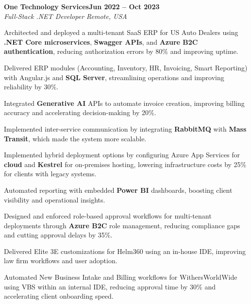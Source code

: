 \documentclass[letterpaper,10pt]{article}
\newcommand{\headingBf}[2]{
  \hspace{10pt}\textbf{#1}\hfill\textbf{#2}\\
}
\newcommand{\headingIt}[2]{
  \hspace{10pt}\textit{#1}\hfill\textit{#2}\\
}
\newenvironment{resume_list}{
  \vspace{-7pt}
  \begin{itemize}[itemsep=-2px, parsep=1pt, leftmargin=30pt]
}{
  \end{itemize}
}
\begin{document}
\headingBf{One Technology Services}{Jun 2022 -- Oct 2023}
\headingIt{Full-Stack .NET Developer \hfill Remote, USA}{}
\begin{resume_list}
    \item Architected and deployed a multi-tenant SaaS ERP for US Auto Dealers using \textbf{.NET Core microservices}, \textbf{Swagger APIs}, and \textbf{Azure B2C authentication}, reducing authorization errors by 80\% and improving uptime.
    \item Delivered ERP modules (Accounting, Inventory, HR, Invoicing, Smart Reporting) with Angular.js and \textbf{SQL Server}, streamlining operations and improving reliability by 30\%.
    \item Integrated \textbf{Generative AI} APIs to automate invoice creation, improving billing accuracy and accelerating decision-making by 20\%.
    \item Implemented inter-service communication by integrating \textbf{RabbitMQ} with \textbf{Mass Transit}, which made the system more scalable.
    \item Implemented hybrid deployment options by configuring Azure App Services for \textbf{cloud} and \textbf{Kestrel} for on-premises hosting, lowering infrastructure costs by 25\% for clients with legacy systems.
    \item Automated reporting with embedded \textbf{Power BI} dashboards, boosting client visibility and operational insights.   
    \item Designed and enforced role-based approval workflows for multi-tenant deployments through \textbf{Azure B2C} role management, reducing compliance gaps and cutting approval delays by 35\%.
    \item Delivered Elite 3E customizations for Helm360 using an in-house IDE, improving law firm workflows and user adoption.
    \item Automated New Business Intake and Billing workflows for WithersWorldWide using VBS within an internal IDE, reducing approval time by 30\% and accelerating client onboarding speed.
\end{resume_list}
\end{document}
